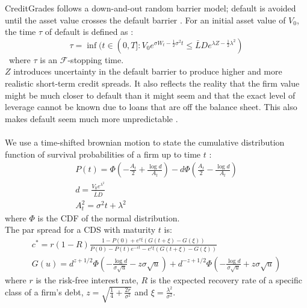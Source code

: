 \documentclass[11t,a4paper]{article}
\begin{document}
CreditGrades follows a down-and-out random barrier model; default is avoided until the asset value crosses the default barrier \cite{sfin}.
For an initial asset value of $V_0$, the time $\tau$ of default is defined as \cite{levycg}:
\[\tau = \inf(t\in(0,T] : V_0e^{\sigma W_t-\frac{1}{2}\sigma^2t} \leq \bar{L}De^{\lambda Z - \frac{1}{2}\lambda^2})\]\
where $\tau$ is an $\mathcal{F}$-stopping time. \\
$Z$ introduces uncertainty in the default barrier to produce higher and more realistic short-term credit spreads. It also reflects the reality that the firm value might be much closer to default than it might seem and that the exact level of leverage cannot be known due to loans that are off the balance sheet. This also makes default seem much more unpredictable \cite{cg}.  
\\
\\
We use a time-shifted brownian motion to state the cumulative distribution function of survival probabilities of a firm up to time $t$ \cite{cg}:
\begin{gather}
P(t) = \Phi(-\frac{A_t}{2} + \frac{\log{d}}{A_t}) - d \Phi(\frac{A_t}{2} - \frac{\log{d}}{A_t})\\
d = \frac{V_0e^{\lambda^2}}{\bar{L}D} \\
A^2_t = \sigma^2t + \lambda^2
\end{gather}
where $\Phi$ is the CDF of the normal distribution. \\
The par spread for a CDS with maturity $t$ is:
\begin{gather}
c^* = r(1-R)\frac{1-P(0)+e^{r\xi}(G(t+\xi) - G(\xi))}{P(0)-P(t)e^{-rt}-e^{r\xi}(G(t+\xi) - G(\xi))} \\
G(u) = d^{z+1/2}\Phi(-\frac{\log{d}}{\sigma\sqrt{u}} - z\sigma\sqrt{u}) + d^{-z+1/2}\Phi(-\frac{\log{d}}{\sigma\sqrt{u}} + z\sigma\sqrt{u}) 
\end{gather} 
 where $r$ is the risk-free interest rate, $R$ is the expected recovery rate of a specific class of a firm's debt, $z = \sqrt{\frac{1}{4} + \frac{2r}{\sigma^2}}$ and $\xi = \frac{\lambda^2}{\sigma^2}$.
\end{document}
